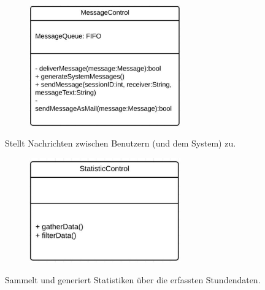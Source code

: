 \begin{itemize}
\begin{itemize}
                    \begin{figure}[htb]
                    \centering
                    \includegraphics[width=6.5cm]{Diagramms/class/singleclass/ControlMessage.pdf}
                    \end{figure}
                    \newline
                        Stellt Nachrichten zwischen Benutzern (und dem System) zu.
                        \begin{itemize}
                        \end{itemize}

                    \begin{figure}[htb]
                    \centering
                    \includegraphics[width=6.5cm]{Diagramms/class/singleclass/ControlStat.pdf}
                    \end{figure}
                    \newline
                        Sammelt und generiert Statistiken über die erfassten Stundendaten.
                        \begin{itemize}
                        \end{itemize}


\end{itemize}
\end{itemize}
